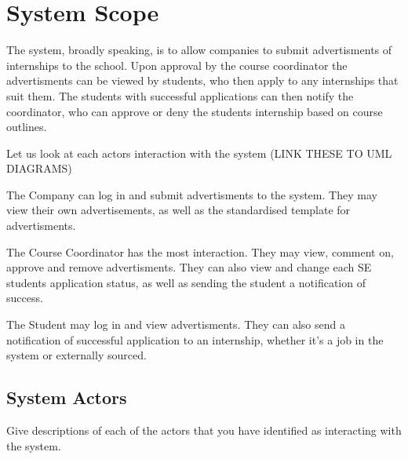 \documentclass{l3deliverable}
\begin{document}

\section{System Scope}




The system, broadly speaking, is to allow companies to submit advertisments 
of internships to the school. Upon approval by the course coordinator the 
advertisments can be viewed by students, who then apply to any internships 
that suit them. The students with successful applications can then notify 
the coordinator, who can approve or deny the students internship based on 
course outlines. 

Let us look at each actors interaction with the system (LINK THESE TO UML
DIAGRAMS)

The Company can log in and submit advertisments to the system. They may 
view their own advertisements, as well as the standardised template for 
advertisments.

The Course Coordinator has the most interaction. They may view, comment 
on, approve and remove advertisments. They can also view and change each 
SE students application status, as well as sending the student a notification
of success.

The Student may log in and view advertisments. They can also send a 
notification of successful application to an internship, whether it's 
a job in the system or externally sourced.


\subsection{System Actors}

Give descriptions of each of the actors that you have identified as
interacting with the system.
\end{document}
